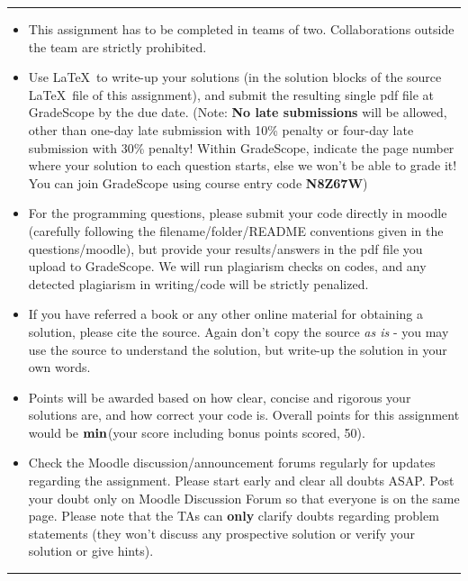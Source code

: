 \documentclass[solution,addpoints,12pt]{exam}
\begin{document}
\vspace{3mm}
\hrule
{\small
\begin{itemize}\itemsep0mm
\item This assignment has to be completed in teams of two. Collaborations outside the team are strictly prohibited.
\item Use \LaTeX\ to write-up your solutions (in the solution blocks of the source \LaTeX\  file of this assignment), and submit the resulting single pdf file at GradeScope by the due date. (Note: {\bf No late submissions} will be allowed, other than one-day late submission with 10\% penalty or four-day late submission with 30\% penalty! Within GradeScope, indicate the page number where your solution to each question starts, else we won't be able to grade it! You can join GradeScope using course entry code {\bf N8Z67W})  
\item For the programming questions, please submit your code directly in moodle (carefully following the filename/folder/README conventions given in the questions/moodle), but provide your results/answers in the pdf file you upload to GradeScope. We will run plagiarism checks on codes, and any detected plagiarism in writing/code will be strictly penalized. 
\item  If you have referred a book or any other online material for obtaining a solution, please cite the source. Again don't copy the source {\it as is} - you may use the source to understand the solution, but write-up the solution in your own words. 
\item Points will be awarded based on how clear, concise and rigorous your solutions are, and how correct your code is. Overall points for this assignment would be ${\bf min}$(your score including bonus points scored, 50).
\item Check the Moodle discussion/announcement forums regularly for updates regarding the assignment. Please start early and clear all doubts ASAP. Post your doubt only on Moodle Discussion Forum so that everyone is on the same page. Please note that the TAs can \textbf{only} clarify doubts regarding problem statements (they won't discuss any prospective solution or verify your solution or give hints). 
\end{itemize}
}
\hrule
\end{document}
